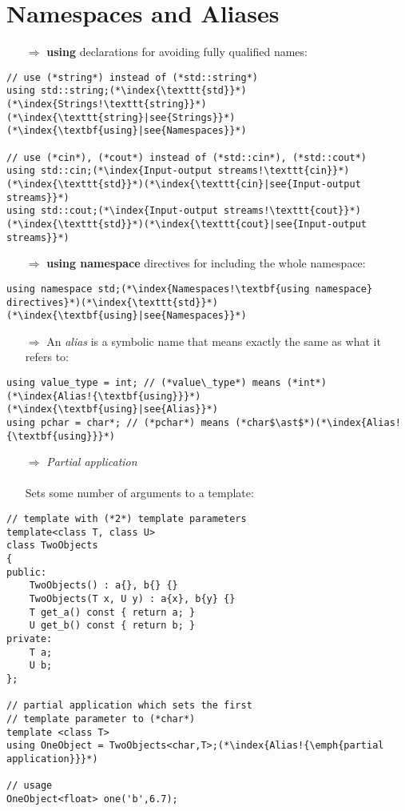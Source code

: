 \documentclass[10pt]{book}
\begin{document}
\section{Namespaces and Aliases}
\begin{enumerate}
\item[$\Rightarrow$] \textbf{using} declarations for avoiding fully qualified names:
\end{enumerate}
\begin{lstlisting}
// use (*string*) instead of (*std::string*)
using std::string;(*\index{\texttt{std}}*)(*\index{Strings!\texttt{string}}*)(*\index{\texttt{string}|see{Strings}}*)(*\index{\textbf{using}|see{Namespaces}}*)

// use (*cin*), (*cout*) instead of (*std::cin*), (*std::cout*)
using std::cin;(*\index{Input-output streams!\texttt{cin}}*)(*\index{\texttt{std}}*)(*\index{\texttt{cin}|see{Input-output streams}}*)
using std::cout;(*\index{Input-output streams!\texttt{cout}}*)(*\index{\texttt{std}}*)(*\index{\texttt{cout}|see{Input-output streams}}*)
\end{lstlisting}
\begin{enumerate}
\item[$\Rightarrow$] \textbf{using namespace} directives for including the whole namespace:
\end{enumerate}
\begin{lstlisting}
using namespace std;(*\index{Namespaces!\textbf{using namespace} directives}*)(*\index{\texttt{std}}*)(*\index{\textbf{using}|see{Namespaces}}*)
\end{lstlisting}
\begin{enumerate}
\item[$\Rightarrow$] An \emph{alias} is a symbolic name that means exactly the same as what it refers to:
\end{enumerate}
\begin{lstlisting}
using value_type = int; // (*value\_type*) means (*int*)(*\index{Alias!{\textbf{using}}}*)(*\index{\textbf{using}|see{Alias}}*)
using pchar = char*; // (*pchar*) means (*char$\ast$*)(*\index{Alias!{\textbf{using}}}*)
\end{lstlisting}
\begin{enumerate}
\item[$\Rightarrow$] \emph{Partial application}\\ \\ Sets some number of arguments to a template:
\end{enumerate}
\begin{lstlisting}
// template with (*2*) template parameters
template<class T, class U>
class TwoObjects
{
public:
    TwoObjects() : a{}, b{} {}
    TwoObjects(T x, U y) : a{x}, b{y} {}
    T get_a() const { return a; }
    U get_b() const { return b; }
private:
    T a;
    U b;
};

// partial application which sets the first
// template parameter to (*char*)
template <class T>
using OneObject = TwoObjects<char,T>;(*\index{Alias!{\emph{partial application}}}*)

// usage
OneObject<float> one('b',6.7);
\end{lstlisting}
%
%
\end{document}
